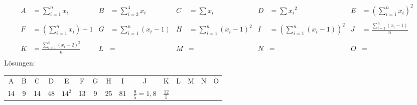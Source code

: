 \begin{align*}
  A &= \sum_{i=1}^{n}x_{i}  &
  B &= \sum_{i=2}^{4}x_{i} &
  C &= \sum{x_{i}} &
  D &= \sum{x_{i}}^2 &
  E &= (\sum_{i=1}^{n}{x_{i}})^2 &\\\\
  F &= (\sum_{i=1}^{n}{x_{i}})-1 &
  G &= \sum_{i=1}^{n}(x_{i}-1) &
  H &= \sum_{i=1}^{n}(x_{i}-1)^2 &
  I &= (\sum_{i=1}^{n}(x_{i}-1))^2 &
  J &= \frac{\sum_{i=1}^{n}(x_{i}-1)}{n} &\\\\
  K &= \frac{\sum_{i=1}^{n}(x_{i}-2)^2}{n} &
  L &=  &
  M &=  &
  N &=  &
  O &=  &\\
\end{align*}
Lösungen:
\begin{tabular}{c|c|c|c|c|c|c|c|c|c|c|c|c|c|c}
    A  & B & C  & D  & E        & F  & G & H  & I        & J                 & K  & L  & M  & N  & O\\
    14 & 9 & 14 & 48 & $14^{2}$ & 13 & 9 & 25 & 81       & $\frac{9}{5}=1,8$ & $\frac{12}{5}$ & {} & {} & {} & {}
\end{tabular}
